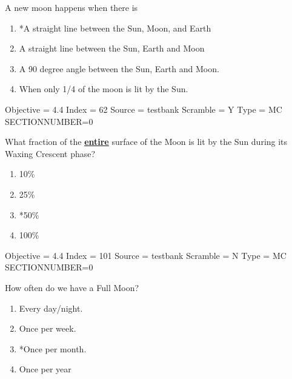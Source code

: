 \documentclass[11pt]{article}
\begin{document}
\begin{enumerate}
\begin{minipage}{\textwidth}
\begin{minipage}{\textwidth}
\item A new moon happens when there is
\begin{enumerate} 
\setlength{\itemsep}{1pt} 
\setlength{\parskip}{0pt} 
\setlength{\parsep}{0pt}
\setlength{\multicolsep}{1pt} 
\item *A straight line between the Sun, Moon, and Earth
\item A straight line between the Sun, Earth and Moon
\item A 90 degree angle between the Sun, Earth and Moon.
\item When only 1/4 of the moon is lit by the Sun.
\end{enumerate} 
Objective = 4.4
Index = 62
Source = testbank
Scramble = Y
Type = MC
SECTIONNUMBER=0
\end{minipage}
\end{minipage}
\vskip 0.20in

\begin{minipage}{\textwidth}
\begin{minipage}{\textwidth}
\item What fraction of the {\bf \underline{entire}} surface of the Moon is lit by the Sun during its Waxing Crescent phase?
\begin{multicols}{3}
\begin{enumerate} 
\setlength{\itemsep}{1pt} 
\setlength{\parskip}{0pt} 
\setlength{\parsep}{0pt}
\setlength{\multicolsep}{1pt} 
\item 10\%
\item 25\%
\item *50\%
\item 100\%
\end{enumerate} 
\vfill 
\end{multicols}

Objective = 4.4
Index = 101
Source = testbank
Scramble = N
Type = MC
SECTIONNUMBER=0
\end{minipage}
\end{minipage}
\vskip 0.20in

\begin{minipage}{\textwidth}
\begin{minipage}{\textwidth}
\item How often do we have a Full Moon?
\begin{multicols}{3}
\begin{enumerate} 
\setlength{\itemsep}{1pt} 
\setlength{\parskip}{0pt} 
\setlength{\parsep}{0pt}
\setlength{\multicolsep}{1pt} 
\item Every day/night.
\item Once per week.
\item *Once per month.
\item Once per year
\end{enumerate} 
\vfill 
\end{multicols}


\end{minipage}
\end{minipage}
\end{enumerate}
\end{document}
